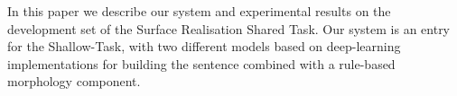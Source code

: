In this paper we describe our system and experimental results on the development set of the Surface Realisation Shared Task. Our system is an entry for the Shallow-Task, with two different models based on deep-learning implementations for building the sentence combined with a rule-based morphology component.
